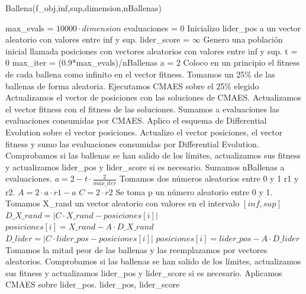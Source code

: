 \documentclass[12pt,a4paper]{article}
\begin{document}
	\begin{algorithm}
		\caption{Ballena(f\_obj,inf,sup,dimension,nBallenas)}
		\begin{algorithmic}
			\STATE max\_evals = $10000\cdot dimension$
			\STATE evaluaciones = 0
			\STATE Inicializo lider\_pos a un vector aleatorio con valores entre inf y sup.
			\STATE lider\_score = $\infty$
			\STATE Genero una población inicial llamada posiciones con vectores aleatorios con valores entre inf y sup.
			\STATE t = 0
			\STATE max\_iter = (0.9*max\_evals)/nBallenas
			\STATE a = 2
			\STATE Coloco en un principio el fitness de cada ballena como infinito en el vector fitness.
					\STATE Tomamos un 25\% de las ballenas de forma aleatoria.
					\STATE Ejecutamos CMAES sobre el 25\% elegido
					\STATE Actualizamos el vector de posiciones con las soluciones de CMAES.
					\STATE Actualizamos el vector fitness con el fitness de las soluciones.
					\STATE Sumamos a evaluaciones las evaluaciones consumidas por CMAES.
				\ENDIF
					\STATE Aplico el esquema de Differential Evolution sobre el vector posiciones.
					\STATE Actualizo el vector posiciones, el vector fitness y sumo las evaluaciones consumidas por Differential Evolution.
				\ENDIF
				\STATE Comprobamos si las ballenas se han salido de los límites, actualizamos sus fitness y actualizamos lider\_pos y lider\_score si es necesario.
				\STATE Sumamos nBallenas a evaluaciones.
				\STATE $a = 2-t\cdot \frac{2}{max\_iter}$
					\STATE Tomamos dos números aleatorios entre 0 y 1 r1 y r2.
					\STATE $A=2\cdot a\cdot r1 - a$
					\STATE $C=2\cdot r2$
					\STATE Se toma p un número aleatorio entre 0 y 1.
							\STATE Tomamos X\_rand un vector aleatorio con valores en el intervalo $[inf,sup]$
							\STATE $D\_X\_rand = |C\cdot X\_rand - posiciones[i]|$
							\STATE $posiciones[i] = X\_rand-A\cdot D\_X\_rand$
						\ELSE
							\STATE $D\_lider = |C\cdot lider\_pos - posiciones[i]|$
							\STATE $posiciones[i] = lider\_pos-A\cdot D\_lider$
						\ENDIF
					\ELSE
						\STATE Tomamos la mitad peor de las ballenas y las reemplazamos por vectores aleatorios.
					\ENDIF
				\ENDFOR
			\ENDWHILE
			\STATE Comprobamos si las ballenas se han salido de los límites, actualizamos sus fitness y actualizamos lider\_pos y lider\_score si es necesario.
			\STATE Aplicamos CMAES sobre lider\_pos.
			\RETURN lider\_pos, lider\_score
		\end{algorithmic}
	\end{algorithm}
\end{document}
